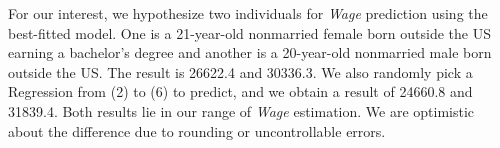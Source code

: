 For our interest, we hypothesize two individuals for \textit{Wage} prediction using the best-fitted model. One is a 21-year-old nonmarried female born outside the US earning a bachelor's degree and another is a 20-year-old nonmarried male born outside the US. The result is 26622.4 and 30336.3. We also randomly pick a Regression from (2) to (6) to predict, and we obtain a result of 24660.8 and 31839.4. Both results lie in our range of \textit{Wage} estimation. We are optimistic about the difference due to rounding or uncontrollable errors.

